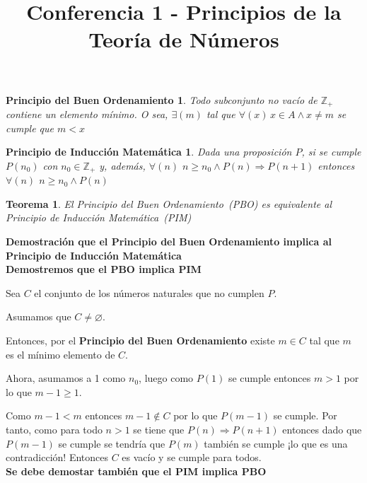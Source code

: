 \documentclass[a4paper,1pt]{report}
\title{Conferencia 1 - Principios de la Teoría de Números}
\author{}
\newtheorem*{pbo}{Principio del Buen Ordenamiento}
\newtheorem*{pim}{Principio de Inducción Matemática}
\newtheorem*{teo}{Teorema}
\begin{document}
\maketitle


\begin{pbo}

Todo subconjunto no vacío de $\mathbb{Z}_{+}$ contiene un elemento mínimo. O sea,
$\exists(m)$ tal que $\forall(x)\, x\in A\wedge x\neq m$ se cumple que $m<x$
\end{pbo}

\begin{pim}
 Dada una proposición $P$, si se cumple $P(n_0)$ con $n_0\in \mathbb{Z}_{+}$ y, además, 
 $\forall(n)$ $n\geq n_0\wedge P(n) \Rightarrow P(n+1)$ entonces $\forall(n)$ $n\geq n_0 \wedge P(n)$
\end{pim}

\begin{teo}
 El Principio del Buen Ordenamiento~(PBO) es equivalente al Principio de Inducción Matemática~(PIM)
\end{teo}

\textbf{Demostración que  el Principio del Buen Ordenamiento implica al Principio de Inducción Matemática}\\

\textbf{Demostremos que el PBO implica PIM}

Sea $C$ el conjunto de los números naturales que no cumplen $P$. 

Asumamos que $C\neq \varnothing$. 

Entonces, por el \textbf{Principio del Buen Ordenamiento} existe $m\in C$ tal que $m$ es el mínimo elemento de $C$.

Ahora, asumamos a 1 como $n_0$, luego como $P(1)$ se cumple entonces $m>1$ por lo que $m-1\geq 1$.

Como $m-1<m$ entonces $m-1\notin C$ por lo que $P(m-1)$ se cumple. Por tanto, como para todo $n>1$ se tiene que $P(n)\Rightarrow P(n+1)$ entonces dado que $P(m-1)$ se cumple se tendría que $P(m)$ también se cumple ¡lo que es una contradicción! Entonces $C$ es vacío y se cumple para todos.\\

\textbf{Se debe demostar también que el PIM implica PBO}\\

\end{document}
